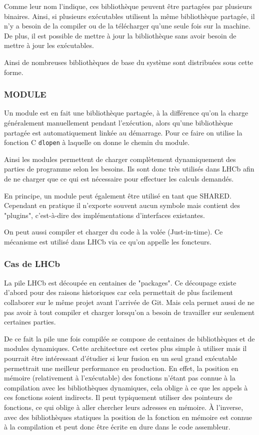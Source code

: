 \documentclass[a4paper,11pt]{report}
\begin{document}
Comme leur nom l'indique, ces bibliothèque peuvent être partagées par plusieurs binaires.
Ainsi, si plusieurs exécutables utilisent la même bibliothèque partagée, il n'y a besoin de la compiler ou de la télécharger qu'une seule fois sur la machine.
De plus, il est possible de mettre à jour la bibliothèque sans avoir besoin de mettre à jour les exécutables.

Ainsi de nombreuses bibliothèques de base du système sont distribuées sous cette forme.

\subsubsection{MODULE}
Un module est en fait une bibliothèque partagée, à la différence qu'on la charge généralement manuellement pendant l'exécution, alors qu'une bibliothèque partagée est automatiquement linkée au démarrage.
Pour ce faire on utilise la fonction C \verb'dlopen' à laquelle on donne le chemin du module.

Ainsi les modules permettent de charger complètement dynamiquement des parties de programme selon les besoins.
Ils sont donc très utilisés dans LHCb afin de ne charger que ce qui est nécessaire pour effectuer les calculs demandés.

En principe, un module peut également être utilisé en tant que SHARED.
Cependant en pratique il n'exporte souvent aucun symbole mais contient des "plugins", c'est-à-dire des implémentations d'interfaces existantes.

On peut aussi compiler et charger du code à la volée (Just-in-time).
Ce mécanisme est utilisé dans LHCb via ce qu'on appelle les foncteurs.

\subsubsection{Cas de LHCb}
La pile LHCb est découpée en centaines de "packages".
Ce découpage existe d'abord pour des raisons historiques car cela permettait de plus facilement collaborer sur le même projet avant l'arrivée de Git.
Mais cela permet aussi de ne pas avoir à tout compiler et charger lorsqu'on a besoin de travailler sur seulement certaines parties.

De ce fait la pile une fois compilée se compose de centaines de bibliothèques et de modules dynamiques.
Cette architecture est certes plus simple à utiliser mais il pourrait être intéressant d'étudier si leur fusion en un seul grand exécutable permettrait une meilleur performance en production.
En effet, la position en mémoire (relativement à l'exécutable) des fonctions n'étant pas connue à la compilation avec les bibliothèques dynamiques, cela oblige à ce que les appels à ces fonctions soient indirects.
Il peut typiquement utiliser des pointeurs de fonctions, ce qui oblige à aller chercher leurs adresses en mémoire.
À l'inverse, avec des bibliothèques statiques la position de la fonction en mémoire est connue à la compilation et peut donc être écrite en dure dans le code assembleur.
\end{document}
